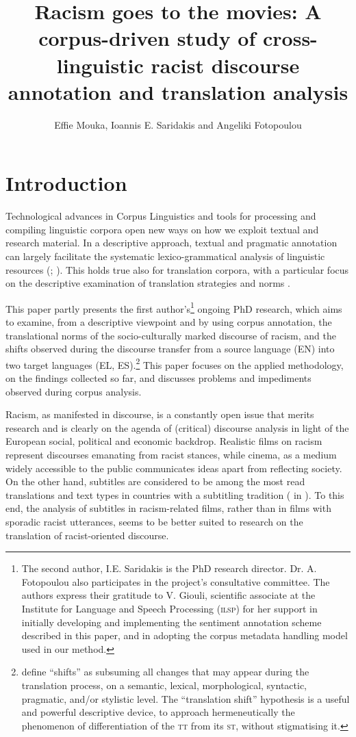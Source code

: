 \documentclass[output=paper]{LSP/langsci}
\author{Effie Mouka, Ioannis E. Saridakis and Angeliki Fotopoulou}
\title{Racism goes to the movies: A corpus-driven study of cross-linguistic racist discourse annotation and translation analysis}
\begin{document}
\section{Introduction} \label{sec:2:1}
Technological advances in Corpus Linguistics and tools for processing and compiling linguistic corpora open new ways on how we exploit textual and research material. In a descriptive approach, textual and pragmatic annotation can largely facilitate the systematic lexico-grammatical analysis of linguistic resources   (\citealt[29--31]{EneryHardie2012}; \citealt[76--79]{Zanettin2012}). This holds true also for translation corpora, with a particular focus on the descriptive examination of translation strategies and norms \citep[78--96]{Zanettin2012}.

This paper partly presents the first author's\footnote{The second author, I.E. Saridakis is the PhD research director. Dr. A. Fotopoulou also participates in the project's consultative committee. The authors express their gratitude to V. Giouli, scientific associate at the Institute for Language and Speech Processing (\textsc{ilsp}) for her support in initially developing and implementing the sentiment annotation scheme described in this paper, and in adopting the corpus metadata handling model used in our method.} ongoing PhD research, which aims to examine, from a descriptive viewpoint and by using corpus annotation, the translational norms of the socio-culturally marked discourse of racism, and the shifts observed during the discourse transfer from a source language (EN) into two target languages (EL, ES).\footnote{\citet[120--121]{Batsalia2010} define “shifts” as subsuming all changes that may appear during the translation process, on a semantic, lexical, morphological, syntactic, pragmatic, and/or stylistic level. The “translation shift” hypothesis is a useful and powerful descriptive device, to approach hermeneutically the phenomenon of differentiation of the \textsc{tt} from its \textsc{st}, without stigmatising it.} This paper focuses on the applied methodology, on the findings collected so far, and discusses problems and impediments observed during corpus analysis.

Racism, as manifested in discourse, is a constantly open issue that merits research \citep{Dijk1993,Reisigl2001} and is clearly on the agenda of (critical) discourse analysis in light of the European social, political and economic backdrop. Realistic films on racism represent discourses emanating from racist stances, while cinema, as a medium widely accessible to the public communicates ideas apart from reflecting society. On the other hand, subtitles are considered to be among the most read translations and text types in countries with a subtitling tradition (\citealt[153]{Gottlieb1997} in \citealt[125]{Pedersen2011}). To this end, the analysis of subtitles in racism-related films, rather than in films with sporadic racist utterances, seems to be better suited to research on the translation of racist-oriented discourse.
\end{document}
